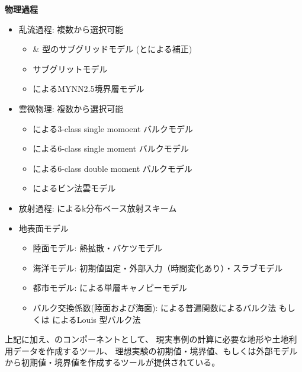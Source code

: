 {\bf 物理過程}
\begin{itemize}
 \item 乱流過程: 複数から選択可能
   \begin{itemize}
    \item \citet{smagorinsky_1963} \& \citet{lilly_1962}型のサブグリッドモデル (\citet{Brown_etal_1994}と\citet{Scotti_1993}による補正)
    \item \citet{Deardorff_1980} サブグリットモデル 
    \item \citet{my_1982,nakanishi_2004}によるMYNN2.5境界層モデル 
   \end{itemize}
 \item 雲微物理: 複数から選択可能
   \begin{itemize}
    \item \citet{kessler_1969}による3-class single momoent バルクモデル
    \item \citet{tomita_2008}による6-class single moment バルクモデル 
    \item \citet{sn_2014}による6-class double moment バルクモデル 
    \item \citet{suzuki_etal_2010}によるビン法雲モデル 
   \end{itemize}
 \item 放射過程: \citet{sekiguchi_2008}によるk分布ベース放射スキーム
 \item 地表面モデル
  \begin{itemize}
   \item 陸面モデル: 熱拡散・バケツモデル
   \item 海洋モデル: 初期値固定・外部入力（時間変化あり）・スラブモデル
   \item 都市モデル: \citet{kusaka_2001}による単層キャノピーモデル 
   \item バルク交換係数(陸面および海面): \citet{beljaars_1991,wilson_2001}による普遍関数によるバルク法
     もしくは \citet{uno_1995}によるLouis 型バルク法
  \end{itemize}
\end{itemize}
上記に加え、\scalerm のコンポーネントとして、
現実事例の計算に必要な地形や土地利用データを作成するツール、
理想実験の初期値・境界値、もしくは外部モデルから初期値・境界値を作成するツールが提供されている。


